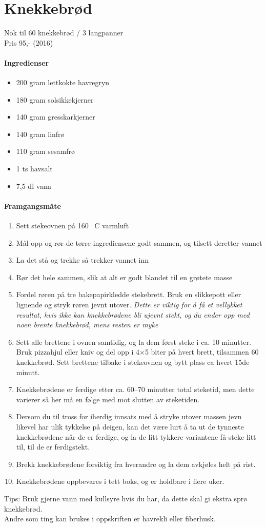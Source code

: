 \section{Knekkebrød}
Nok til 60 knekkebrød / 3 langpanner\\
Pris 95,- (2016)

\paragraph{Ingredienser}
\begin{itemize}[noitemsep]
  \item 200 gram lettkokte havregryn
  \item 180 gram solsikkekjerner
  \item 140 gram gresskarkjerner
  \item 140 gram linfrø
  \item 110 gram sesamfrø
  \item 1 ts havsalt
  \item 7,5 dl vann
\end{itemize}

\paragraph{Framgangsmåte}
\begin{enumerate}[noitemsep]
  \item Sett stekeovnen på 160 \degree~C varmluft
  \item Mål opp og rør de tørre ingrediensene godt sammen, og tilsett deretter vannet
  \item La det stå og trekke så trekker vannet inn
  \item Rør det hele sammen, slik at alt er godt blandet til en grøtete masse
  \item Fordel røren på tre bakepapirkledde stekebrett. Bruk en slikkepott eller lignende og stryk røren jevnt utover. \emph{Dette er viktig for å få et vellykket resultat, hvis ikke kan knekkebrødene bli ujevnt stekt, og du ender opp med noen brente knekkebrød, mens resten er myke}
  \item Sett alle brettene i ovnen samtidig, og la dem først steke i ca. 10 minutter. Bruk pizzahjul eller kniv og del opp i 4×5 biter på hvert brett, tilsammen 60 knekkebrød. Sett brettene tilbake i stekeovnen og bytt plass ca hvert 15de minutt.
  \item Knekkebrødene er ferdige etter ca. 60--70 minutter total steketid, men dette varierer så her må en følge med mot slutten av steketiden.
  \item Dersom du til tross for iherdig innsats med å stryke utover massen jevn likevel har ulik tykkelse på deigen, kan det være lurt å ta ut de tynneste knekkebrødene når de er ferdige, og la de litt tykkere variantene få steke litt til, til de er ferdigstekt.
  \item Brekk knekkebrødene forsiktig fra hverandre og la dem avkjøles helt på rist.
  \item Knekkebrødene oppbevares i tett boks, og er holdbare i flere uker.
\end{enumerate}



Tips: Bruk gjerne vann med kullsyre hvis du har, da dette skal gi ekstra sprø knekkebrød. \\ Andre som ting kan brukes i oppskriften er havrekli eller fiberhusk.
